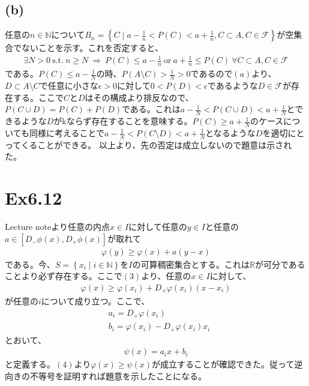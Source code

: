 \documentclass{article}
\begin{document}
\subsection{(b)}
任意の$n \in \mathbb{N}$について$B_n = \left\{ C \mid a - \frac{1}{n} < P(C) < a + \frac{1}{n}, C \subset A, C \in \mathcal{F}\right\}$が空集合でないことを示す。これを否定すると、
\begin{align*}
	\exists N > 0\ \text{s.t.}\ n \geq N\ \Rightarrow\ P(C) \leq a - \frac{1}{n}\ \text{or}\ a + \frac{1}{n} \leq P(C)\ \forall C \subset A, C \in \mathcal{F}
\end{align*}
である。$P(C) \leq a - \frac{1}{N}$の時、$P(A \setminus C) > \frac{1}{N} > 0$であるので$(a)$より、$D \subset A \setminus C$で任意に小さな$\epsilon > 0$に対して$0 < P(D) < \epsilon$であるような$D \in \mathcal{F}$が存在する。ここで$C$と$D$はその構成より排反なので、$P(C \cup D) = P(C) + P(D)$である。これは$a - \frac{1}{N} < P(C\cup D) < a + \frac{1}{N}$とできるような$D$がkならず存在することを意味する。$P(C) \geq a + \frac{1}{N}$のケースについても同様に考えることで$a - \frac{1}{N} < P(C\setminus D) < a + \frac{1}{N}$となるような$D$を適切にとってくることができる。
以上より、先の否定は成立しないので題意は示された。

\section{Ex6.12}
Lecture noteより任意の内点$x \in I$に対して任意の$y \in I$と任意の$a \in \left[ D_{-}\phi(x), D_{+}\phi(x) \right]$が取れて
\begin{align}
	\varphi(y) \geq \varphi(x) + a(y-x)
\end{align}
である。今、$S = \left\{ x_i \mid i \in \mathbb{N} \right\}$を$I$の可算稠密集合とする。これは$\mathbb{R}$が可分であることより必ず存在する。ここで$(3)$より、任意の$x\in I$に対して、
\begin{align}
	\varphi(x) \geq \varphi(x_i) + D_{+}\varphi(x_i) (x - x_i)
\end{align}
が任意の$i$について成り立つ。ここで、
\begin{align*}
	&a_i = D_{+}\varphi(x_i)\\
	&b_i = \varphi(x_i) - D_{+}\varphi(x_i) x_i
\end{align*}
とおいて、
\begin{align*}
	\psi(x) = a_i x + b_i
\end{align*}
と定義する。$(4)$より$\varphi(x) \geq \psi(x)$が成立することが確認できた。従って逆向きの不等号を証明すれば題意を示したことになる。
\end{document}
